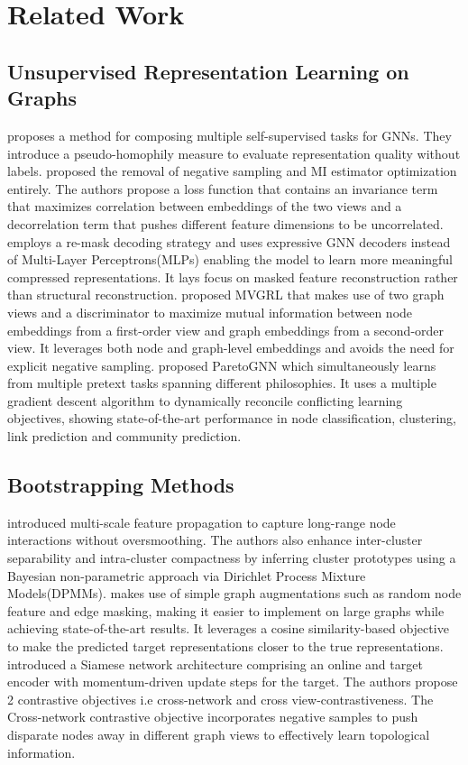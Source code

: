 \section{Related Work}
\subsection{Unsupervised Representation Learning on Graphs}
\citep{jin2021automated} proposes a method for composing multiple self-supervised tasks for GNNs. They introduce a pseudo-homophily measure to evaluate representation quality without labels. \citep{zhang2021canonical} proposed the removal of negative sampling and MI estimator optimization entirely. The authors propose a loss function that contains an invariance term that maximizes correlation between embeddings of the two views and a decorrelation term that pushes different feature dimensions to be uncorrelated. \citep{hou2022graphmae} employs a re-mask decoding strategy and uses expressive GNN decoders instead of Multi-Layer Perceptrons(MLPs) enabling the model to learn more meaningful compressed representations. It lays focus on masked feature reconstruction rather than structural reconstruction. \citep{hassani2020contrastive} proposed MVGRL that makes use of two graph views and a discriminator to maximize mutual information between node embeddings from a first-order view and graph embeddings from a second-order view. It leverages both node and graph-level embeddings and avoids the need for explicit negative sampling. \citep{ju2022multi} proposed ParetoGNN which simultaneously learns from multiple pretext tasks spanning different philosophies. It uses a multiple gradient descent algorithm to dynamically reconcile conflicting learning objectives, showing state-of-the-art performance in node classification, clustering, link prediction and community prediction. 

\subsection{Bootstrapping Methods}
 \citep{ding2023eliciting} introduced  multi-scale feature propagation to capture long-range node interactions without oversmoothing. The authors also enhance inter-cluster separability and intra-cluster compactness by inferring cluster prototypes using a Bayesian non-parametric approach via Dirichlet Process Mixture Models(DPMMs). \citep{thakoor2021large} makes use of simple graph augmentations such as random node feature and edge masking, making it easier to implement on large graphs while achieving state-of-the-art results. It leverages a cosine similarity-based objective to make the predicted target representations closer to the true representations. \citep{jin2021multi} introduced a Siamese network architecture comprising an online and target encoder with momentum-driven update steps for the target. The authors propose 2 contrastive objectives i.e cross-network and cross view-contrastiveness. The Cross-network contrastive objective incorporates negative samples to push disparate nodes away in different graph views to effectively learn topological information.


